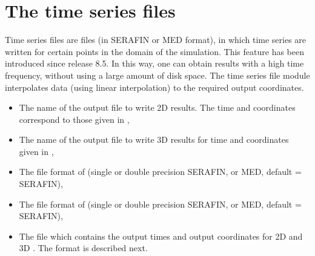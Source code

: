 \section{The time series files}
Time series files are files (in SERAFIN or MED format), in which time series are
written for certain points in the domain of the simulation.
This feature has been introduced since release 8.5.
In this way, one can obtain results with a high time frequency, without using
a large amount of disk space.
The time series file module interpolates data (using linear interpolation)
to the required output coordinates.
\begin{itemize}
\item {} The name of the output file to write
2D results.
The time and coordinates correspond to those given in
,
\item {} The name of the output file to write
3D results for time and
coordinates given in ,
\item {} The file format of
 (single or double precision SERAFIN, or MED,
default = SERAFIN),
\item {} The file format of
 (single or double precision SERAFIN, or MED,
default = SERAFIN),
\item {} The file which contains the output
times and output coordinates for 2D and 3D .
The format is described next.
\end{itemize}

